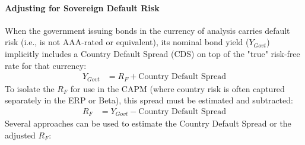 \paragraph{Adjusting for Sovereign Default Risk} \label{sec:adjust_debt_default_risk}
When the government issuing bonds in the currency of analysis carries default risk (i.e., is not AAA-rated or equivalent), its nominal bond yield (\(Y_{Govt}\)) implicitly includes a Country Default Spread (CDS) on top of the "true" risk-free rate for that currency:
\begin{align*}
    Y_{Govt} & = R_F + \text{Country Default Spread}
\end{align*}
To isolate the \(R_F\) for use in the CAPM (where country risk is often captured separately in the ERP or Beta), this spread must be estimated and subtracted:
\begin{align*}
    R_F & = Y_{Govt} - \text{Country Default Spread}
\end{align*}
Several approaches can be used to estimate the Country Default Spread or the adjusted \(R_F\):

